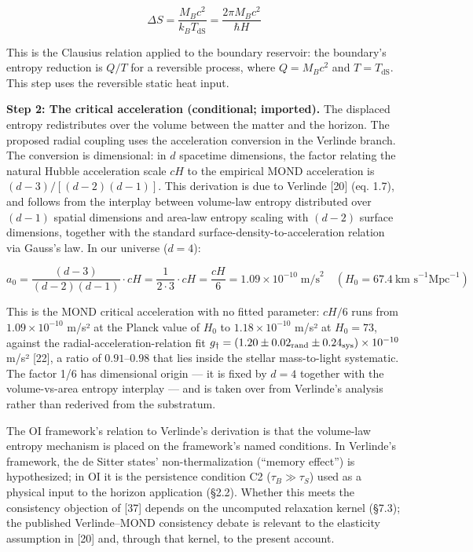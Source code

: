\documentclass[
]{article}
\begin{document}
\[\Delta S = \frac{M_B c^2}{k_B T_{\text{dS}}} = \frac{2\pi M_B c^2}{\hbar H}\]

This is the Clausius relation applied to the boundary reservoir: the
boundary's entropy reduction is \(Q/T\) for a reversible process, where
\(Q = M_B c^2\) and \(T = T_{\text{dS}}\). This step uses the reversible
static heat input.

\textbf{Step 2: The critical acceleration (conditional; imported).} The
displaced entropy redistributes over the volume between the matter and
the horizon. The proposed radial coupling uses the acceleration
conversion in the Verlinde branch. The conversion is dimensional: in
\(d\) spacetime dimensions, the factor relating the natural Hubble
acceleration scale \(cH\) to the empirical MOND acceleration is
\((d-3)/[(d-2)(d-1)]\). This derivation is due to Verlinde {[}20{]} (eq.
1.7), and follows from the interplay between volume-law entropy
distributed over \((d-1)\) spatial dimensions and area-law entropy
scaling with \((d-2)\) surface dimensions, together with the standard
surface-density-to-acceleration relation via Gauss's law. In our
universe (\(d = 4\)):

\[a_0 = \frac{(d-3)}{(d-2)(d-1)} \cdot cH = \frac{1}{2 \cdot 3} \cdot cH = \frac{cH}{6} = 1.09 \times 10^{-10} \; \text{m/s}^2 \quad (H_0 = 67.4\ \text{km s}^{-1}\text{Mpc}^{-1})\]

This is the MOND critical acceleration with no fitted parameter:
\(cH/6\) runs from \(1.09 \times 10^{-10}\) m/s² at the Planck value of
\(H_0\) to \(1.18 \times 10^{-10}\) m/s² at \(H_0 = 73\), against the
radial-acceleration-relation fit
\(g_\dagger = (1.20 \pm 0.02_{\rm rand} \pm 0.24_{\rm sys}) \times 10^{-10}\)
m/s² {[}22{]}, a ratio of \(0.91\)--\(0.98\) that lies inside the
stellar mass-to-light systematic. The factor 1/6 has dimensional origin
--- it is fixed by \(d = 4\) together with the volume-vs-area entropy
interplay --- and is taken over from Verlinde's analysis rather than
rederived from the substratum.

The OI framework's relation to Verlinde's derivation is that the
volume-law entropy mechanism is placed on the framework's named
conditions. In Verlinde's framework, the de Sitter states'
non-thermalization (``memory effect'') is hypothesized; in OI it is the
persistence condition C2 (\(\tau_B \gg \tau_S\)) used as a physical
input to the horizon application (§2.2). Whether this meets the
consistency objection of {[}37{]} depends on the uncomputed relaxation
kernel (§7.3); the published Verlinde--MOND consistency debate is
relevant to the elasticity assumption in {[}20{]} and, through that
kernel, to the present account.
\end{document}
